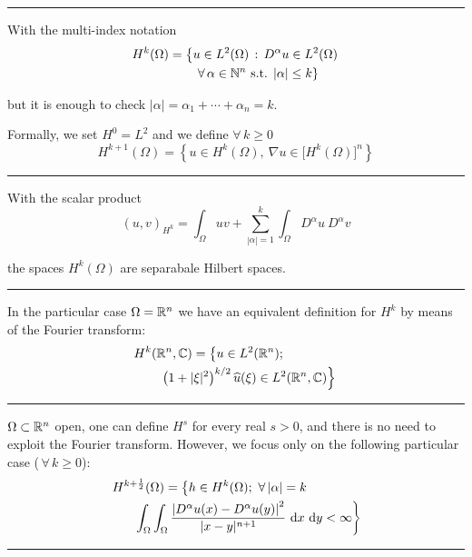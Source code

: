 \rule{0.31\textwidth}{0.2pt}

With the multi-index notation
\begin{align*}
H^k(\Omega) &= \left\{ u\in L^2(\Omega)\,:\,D^\alpha u\in L^2(\Omega) \right. \\
&\qquad \left. \forall\,\alpha\in\mathbb{N}^n\text{ s.t. }|\alpha|\leq k \right\}
\end{align*}

but it is enough to check $|\alpha|=\alpha_1+\cdots+\alpha_n=k$.

\smallskip

Formally, we set $H^0=L^2$ and we define $\forall\, k\geq 0$
\begin{equation*}
H^{k+1}(\Omega)=\left\{ u\in H^k(\Omega),\ \nabla u \in \big[H^k(\Omega)\big]^n \right\}
\end{equation*}

\rule{0.31\textwidth}{0.2pt}
\smallskip

With the scalar product
\begin{equation*}
(u,v)_{H^k}=\int_\Omega uv+\sum_{|\alpha|=1}^k \int_\Omega D^\alpha u\ D^\alpha v
\end{equation*}

the spaces $H^k(\Omega)$ are separabale Hilbert spaces.

\rule{0.31\textwidth}{0.2pt}
\smallskip

In the particular case $\Omega=\mathbb{R}^n$ we have an equivalent definition for $H^k$ by means of the Fourier transform:
\begin{gather*}
H^k(\mathbb{R}^n,\mathbb{C})= \left\{ u\in L^2(\mathbb{R}^n); \right. \qquad\qquad \\
\qquad \left. \left( 1+ | \xi |^2 \right)^{k/2}\widehat{u}(\xi)\in L^2(\mathbb{R}^n,\mathbb{C}) \right\}
\end{gather*}

\rule{0.31\textwidth}{0.2pt}
\smallskip

$\Omega\subset\mathbb{R}^n$ open, one can define $H^s$ for every real $s>0$, and there is no need to exploit the Fourier transform. However, we focus only on the following particular case ($\,\forall\, k\geq 0$):
\begin{gather*}
H^{k+\frac{1}{2}}(\Omega)= \left\{ h\in H^k(\Omega);\ \forall\, |\alpha|=k \right. \qquad\qquad \\
\left. \qquad\int_\Omega \int_\Omega \frac{\left| D^\alpha u(x)-D^\alpha u(y) \right|^2}{|x-y|^{n+1}}\  \mathrm{d} x\  \mathrm{d} y<\infty  \right\}
\end{gather*}

\rule{0.31\textwidth}{0.2pt}

